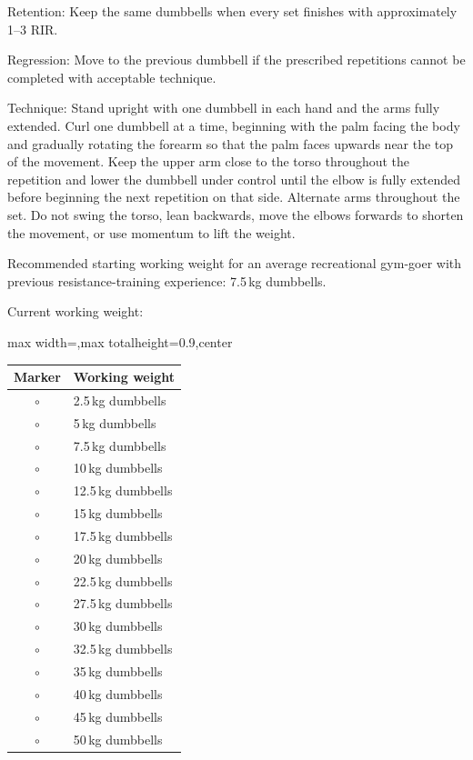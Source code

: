 \documentclass[11pt,a4paper]{article}
\newcommand{\tablearraystretch}{1.15}
\begin{document}
Retention: Keep the same dumbbells when every set finishes with approximately 1--3 RIR.

Regression: Move to the previous dumbbell if the prescribed repetitions cannot be completed with acceptable technique.

Technique: Stand upright with one dumbbell in each hand and the arms fully extended. Curl one dumbbell at a time, beginning with the palm facing the body and gradually rotating the forearm so that the palm faces upwards near the top of the movement. Keep the upper arm close to the torso throughout the repetition and lower the dumbbell under control until the elbow is fully extended before beginning the next repetition on that side. Alternate arms throughout the set. Do not swing the torso, lean backwards, move the elbows forwards to shorten the movement, or use momentum to lift the weight.

Recommended starting working weight for an average recreational gym-goer with previous resistance-training experience: 7.5\,kg dumbbells.

Current working weight:

\begin{center}
\renewcommand{\arraystretch}{\tablearraystretch}
\begin{adjustbox}{max width=\linewidth,max totalheight=0.9\textheight,center}
\begin{tabular}{cl}
\toprule
Marker & Working weight \\
\midrule
$\circ$ & 2.5\,kg dumbbells \\
$\circ$ & 5\,kg dumbbells \\
$\circ$ & 7.5\,kg dumbbells \\
$\circ$ & 10\,kg dumbbells \\
$\circ$ & 12.5\,kg dumbbells \\
$\circ$ & 15\,kg dumbbells \\
$\circ$ & 17.5\,kg dumbbells \\
$\circ$ & 20\,kg dumbbells \\
$\circ$ & 22.5\,kg dumbbells \\
$\circ$ & 27.5\,kg dumbbells \\
$\circ$ & 30\,kg dumbbells \\
$\circ$ & 32.5\,kg dumbbells \\
$\circ$ & 35\,kg dumbbells \\
$\circ$ & 40\,kg dumbbells \\
$\circ$ & 45\,kg dumbbells \\
$\circ$ & 50\,kg dumbbells \\
\bottomrule
\end{tabular}
\end{adjustbox}
\renewcommand{\arraystretch}{1}
\end{center}
\end{document}
